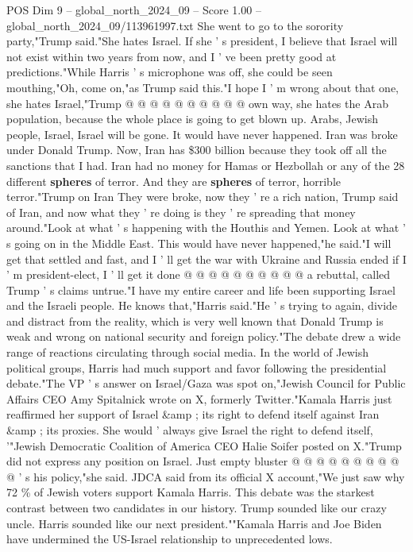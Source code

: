 \begin{textsample}{POS Dim 9 – global\_north\_2024\_09 – Score 1.00 – global\_north\_2024\_09/113961997.txt}
She went to go to the sorority party,"Trump said."She hates Israel.
If she ' s president, I believe that Israel will not exist within two years from now, and I ' ve been pretty good at predictions."While Harris ' s microphone was off, she could be seen mouthing,"Oh, come on,"as Trump said this."I hope I ' m wrong about that one, she hates Israel,"Trump @ @ @ @ @ @ @ @ @ @ own way, she hates the Arab population, because the whole place is going to get blown up.
Arabs, Jewish people, Israel, Israel will be gone.
It would have never happened.
Iran was broke under Donald Trump.
Now, Iran has \$300 billion because they took off all the sanctions that I had.
Iran had no money for Hamas or Hezbollah or any of the 28 different \textbf{spheres} of terror.
And they are \textbf{spheres} of terror, horrible terror."Trump on Iran They were broke, now they ' re a rich nation, Trump said of Iran, and now what they ' re doing is they ' re spreading that money around."Look at what ' s happening with the Houthis and Yemen.
Look at what ' s going on in the Middle East.
This would have never happened,"he said."I will get that settled and fast, and I ' ll get the war with Ukraine and Russia ended if I ' m president-elect, I ' ll get it done @ @ @ @ @ @ @ @ @ @ a rebuttal, called Trump ' s claims untrue."I have my entire career and life been supporting Israel and the Israeli people.
He knows that,"Harris said."He ' s trying to again, divide and distract from the reality, which is very well known that Donald Trump is weak and wrong on national security and foreign policy."The debate drew a wide range of reactions circulating through social media.
In the world of Jewish political groups, Harris had much support and favor following the presidential debate."The VP ' s answer on Israel/Gaza was spot on,"Jewish Council for Public Affairs CEO Amy Spitalnick wrote on X, formerly Twitter."Kamala Harris just reaffirmed her support of Israel \&amp ; its right to defend itself against Iran \&amp ; its proxies.
She would ' always give Israel the right to defend itself, '"Jewish Democratic Coalition of America CEO Halie Soifer posted on X."Trump did not express any position on Israel.
Just empty bluster @ @ @ @ @ @ @ @ @ @ ' s his policy,"she said.
JDCA said from its official X account,"We just saw why 72 \% of Jewish voters support Kamala Harris.
This debate was the starkest contrast between two candidates in our history.
Trump sounded like our crazy uncle.
Harris sounded like our next president.""Kamala Harris and Joe Biden have undermined the US-Israel relationship to unprecedented lows.

\end{textsample}
